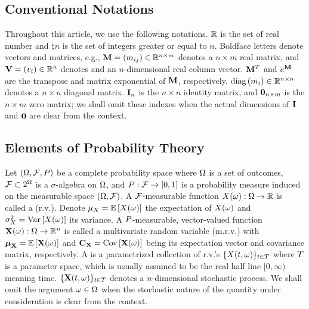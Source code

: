 \subsection{Conventional Notations}
Throughout this article, we use the following notations. $\mathbb{R}$ is the set of real number and $\natural{n}$ is the set of integers greater or equal to $n$. Boldface letters denote vectors and matrices, e.g., $\m{M} = \mtx{m_{ij}} \in \real^{n \times m}$ denotes a $n \times m$ real matrix, and $\mathbf{V} = (v_i) \in \mathbb{R}^n$ denotes and an $n$-dimensional real column vector. $\m{M}^T$ and $e^\m{M}$ are the transpose and matrix exponential of $\m{M}$, respectively. $\text{diag}\left(m_i\right) \in \mathbb{R}^{n \times n}$ denotes a $n \times n$ diagonal matrix. $\mI_n$ is the $n \times n$ identity matrix, and $\mZero_{n \times m}$ is the $n \times m$ zero matrix; we shall omit these indexes when the actual dimensions of $\mI$ and $\mZero$ are clear from the context.

\subsection{Elements of Probability Theory}
Let $(\Omega, \mathcal{F}, P)$ be a complete probability space \cite{durrett2010} where $\Omega$ is a set of outcomes, $\mathcal{F} \subset 2^\Omega$ is a $\sigma$-algebra on $\Omega$, and $P: \mathcal{F} \to [0, 1]$ is a probability measure induced on the measurable space $(\Omega, \mathcal{F})$. A $\mathcal{F}$-measurable function $\rv{X}(\o): \outcomes \to \real$ is called a  (r.v.). Denote $\exp_\rv{X} = \oExp{\rv{X}(\o)}$ the expectation of $\rv{X}(\o)$ and $\var_\rv{X} = \oVar{\rv{X}(\o)}$ its variance. A $P$-measurable, vector-valued function $\mrv{X}(\o): \outcomes \to \real^n$ is called a multivariate random variable (m.r.v.) with $\vExp_\mrv{X} = \oExp{\mrv{X}(\o)}$ and $\mCov_\mrv{X} = \oCov{\mrv{X}(\o)}$ being its expectation vector and covariance matrix, respectively. A  is a parametrized collection of r.v.'s $\{ \rv{X}(\t, \o) \}_{\t \in \sTime}$ where $T$ is a parameter space, which is usually assumed to be the real half line $[0, \infty)$ meaning time. $\{ \mrv{X}(\t, \o) \}_{\t \in \sTime}$ denotes a $n$-dimensional stochastic process. We shall omit the argument $\omega \in \Omega$ when the stochastic nature of the quantity under consideration is clear from the context.

